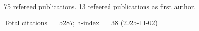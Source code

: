 75 refereed publications. 13 refeered publications as first author.

Total citations~=~5287; h-index~=~38 (2025-11-02)